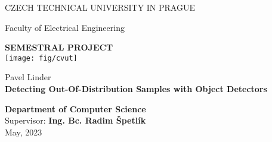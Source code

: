 
\begin{titlepage}
\begin{center}

CZECH TECHNICAL UNIVERSITY IN PRAGUE
\vskip 10pt

\vskip 8pt
Faculty of Electrical Engineering
 
\vspace{50pt}
{\Huge\bf SEMESTRAL PROJECT}\\
\vspace{40pt}
\texttt{[image: fig/cvut]}

\vspace{40pt}
{\Large\rm Pavel Linder} \\
\vspace{20pt}
{{\Large{\bf Detecting Out-Of-Distribution Samples with Object Detectors}}}


\vspace{40pt}
{\bf Department of Computer Science}\\
\vspace{5pt}   
{Supervisor: {\bf Ing. Bc. Radim Špetlík}}\\
\vspace{5pt}  
{May, 2023}

\vspace{30pt}
\end{center}
\end{titlepage}
